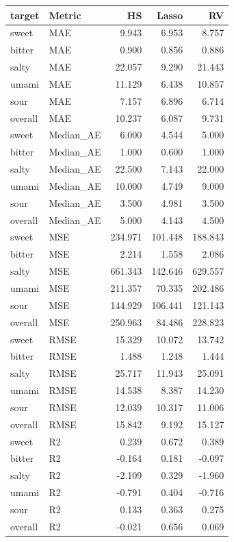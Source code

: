 \begin{tabular}{llrrr}
\toprule
target & Metric & HS & Lasso & RV \\
\midrule
sweet & MAE & 9.943 & 6.953 & 8.757 \\
bitter & MAE & 0.900 & 0.856 & 0.886 \\
salty & MAE & 22.057 & 9.290 & 21.443 \\
umami & MAE & 11.129 & 6.438 & 10.857 \\
sour & MAE & 7.157 & 6.896 & 6.714 \\
overall & MAE & 10.237 & 6.087 & 9.731 \\
sweet & Median_AE & 6.000 & 4.544 & 5.000 \\
bitter & Median_AE & 1.000 & 0.600 & 1.000 \\
salty & Median_AE & 22.500 & 7.143 & 22.000 \\
umami & Median_AE & 10.000 & 4.749 & 9.000 \\
sour & Median_AE & 3.500 & 4.981 & 3.500 \\
overall & Median_AE & 5.000 & 4.143 & 4.500 \\
sweet & MSE & 234.971 & 101.448 & 188.843 \\
bitter & MSE & 2.214 & 1.558 & 2.086 \\
salty & MSE & 661.343 & 142.646 & 629.557 \\
umami & MSE & 211.357 & 70.335 & 202.486 \\
sour & MSE & 144.929 & 106.441 & 121.143 \\
overall & MSE & 250.963 & 84.486 & 228.823 \\
sweet & RMSE & 15.329 & 10.072 & 13.742 \\
bitter & RMSE & 1.488 & 1.248 & 1.444 \\
salty & RMSE & 25.717 & 11.943 & 25.091 \\
umami & RMSE & 14.538 & 8.387 & 14.230 \\
sour & RMSE & 12.039 & 10.317 & 11.006 \\
overall & RMSE & 15.842 & 9.192 & 15.127 \\
sweet & R2 & 0.239 & 0.672 & 0.389 \\
bitter & R2 & -0.164 & 0.181 & -0.097 \\
salty & R2 & -2.109 & 0.329 & -1.960 \\
umami & R2 & -0.791 & 0.404 & -0.716 \\
sour & R2 & 0.133 & 0.363 & 0.275 \\
overall & R2 & -0.021 & 0.656 & 0.069 \\

\end{tabular}
